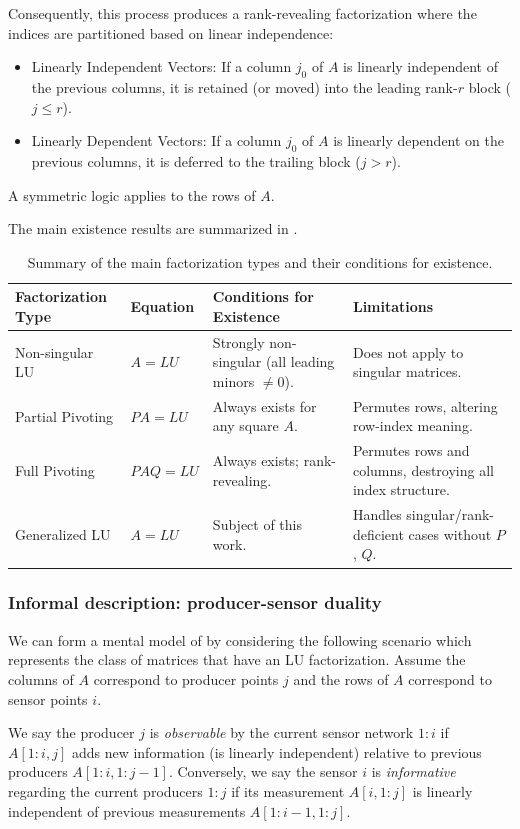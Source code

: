 \documentclass[10pt,twoside]{siamart1116}
\numberwithin{theorem}{section}
\begin{document}
Consequently, this process produces a rank-revealing factorization where the indices are partitioned based on linear independence:
\begin{itemize}
	\item Linearly Independent Vectors: If a column $j_0$ of $A$ is linearly independent of the previous columns, it is retained (or moved) into the leading rank-$r$ block ($j \le r$).
	\item Linearly Dependent Vectors: If a column $j_0$ of $A$ is linearly dependent on the previous columns, it is deferred to the trailing block ($j > r$).
\end{itemize}
A symmetric logic applies to the rows of $A$.

The main existence results are summarized in .

\begin{table}[htbp]
	\centering
	\begin{tabular}{llp{4cm}p{6cm}}
		\toprule
		Factorization Type & Equation & Conditions for Existence & Limitations \\
		\midrule
		Non-singular LU & $A=LU$ & Strongly non-singular (all leading minors $\neq 0$). & Does not apply to singular matrices. \\
		Partial Pivoting & $PA=LU$ & \raggedright Always exists for any square $A$. & \raggedright Permutes rows, altering row-index meaning.\tabularnewline
		Full Pivoting & $PAQ=LU$ & \raggedright Always exists; rank-revealing. & \raggedright Permutes rows and columns, destroying all index structure.\tabularnewline
		Generalized LU & $A=LU$ & Subject of this work. & \raggedright Handles singular/rank-deficient cases without $P$, $Q$.\tabularnewline
		\bottomrule
	\end{tabular}
	\caption{Summary of the main factorization types and their conditions for existence.}\label{tab:main}
\end{table}

\subsubsection*{Informal description: producer-sensor duality}

We can form a mental model of  by considering the following scenario which represents the class of matrices that have an LU factorization. Assume the columns of $A$ correspond to producer points $j$ and the rows of $A$ correspond to sensor points $i$.

We say the producer $j$ is \emph{observable} by the current sensor network $1:i$ if $A[1:i,j]$ adds new information (is linearly independent) relative to previous producers $A[1:i,1:j-1]$. Conversely, we say the sensor $i$ is \emph{informative} regarding the current producers $1:j$ if its measurement $A[i,1:j]$ is linearly independent of previous measurements $A[1:i-1,1:j]$.
\end{document}
